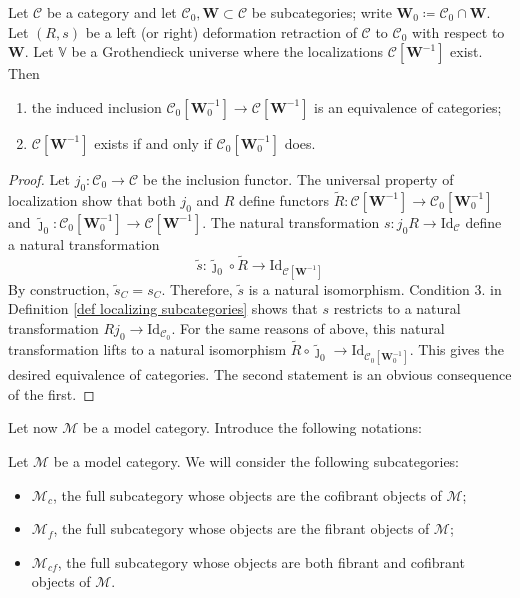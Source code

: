 \begin{refsection}
\begin{prop} \label{prop localizing subcategories}
Let $\mathcal C$ be a category and let $\mathcal C_0, \mathbf W \subset \mathcal C$ be subcategories; write $\mathbf W_0\coloneqq \mathcal C_0 \cap \mathbf W$. Let $(R,s)$ be a left (or right) deformation retraction of $\mathcal C$ to $\mathcal C_0$ with respect to $\mathbf W$. Let $\mathbb V$ be a Grothendieck universe where the localizations $\mathcal C[\mathbf W^{-1}]$ exist. Then
\begin{enumerate}
\item the induced inclusion $\mathcal C_0[\mathbf W_0^{-1}] \to \mathcal C[\mathbf W^{-1}]$ is an equivalence of categories;
\item $\mathcal C[\mathbf W^{-1}]$ exists if and only if $\mathcal C_0[\mathbf W_0^{-1}]$ does.
\end{enumerate}
\end{prop}

\begin{proof}
Let $j_0 \colon \mathcal C_0 \to \mathcal C$ be the inclusion functor. The universal property of localization show that both $j_0$ and $R$ define functors $\widetilde{R} \colon \mathcal C[\mathbf W^{-1}] \to \mathcal C_0[\mathbf W_0^{-1}]$ and $\widetilde{\jmath}_0 \colon \mathcal C_0[\mathbf W_0^{-1}] \to \mathcal C[\mathbf W^{-1}]$. The natural transformation $s \colon j_0 R \to \mathrm{Id}_{\mathcal C}$ define a natural transformation
\[
\widetilde{s} \colon \widetilde{\jmath}_0 \circ \widetilde{R} \to \mathrm{Id}_{\mathcal C[\mathbf W^{-1}]}
\]
By construction, $\widetilde{s}_C = s_C$. Therefore, $\widetilde{s}$ is a natural isomorphism. Condition 3. in Definition \ref{def localizing subcategories} shows that $s$ restricts to a natural transformation $R j_0 \to \mathrm{Id}_{\mathcal C_0}$. For the same reasons of above, this natural transformation lifts to a natural isomorphism $\widetilde{R} \circ  \widetilde{\jmath}_0 \to \mathrm{Id}_{\mathcal C_0[\mathbf W_0^{-1}]}$. This gives the desired equivalence of categories. The second statement is an obvious consequence of the first.
\end{proof}

Let now $\mathcal M$ be a model category. Introduce the following notations:

\begin{notation}
Let $\mathcal M$ be a model category. We will consider the following subcategories:
\begin{itemize}
\item $\mathcal M_c$, the full subcategory whose objects are the cofibrant objects of $\mathcal M$;
\item $\mathcal M_f$, the full subcategory whose objects are the fibrant objects of $\mathcal M$;
\item $\mathcal M_{cf}$, the full subcategory whose objects are both fibrant and cofibrant objects of $\mathcal M$.
\end{itemize}
\end{notation}


\end{refsection}
